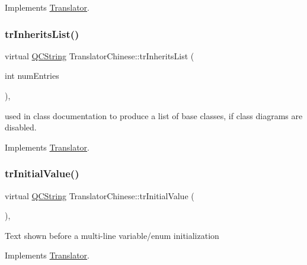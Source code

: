 Implements \mbox{\hyperlink{class_translator}{Translator}}.

\mbox{\label{class_translator_chinese_a62ac805a454546880c04bdf96c86b2ef}} 
\subsubsection{\texorpdfstring{trInheritsList()}{trInheritsList()}}
{\footnotesize\ttfamily virtual \mbox{\hyperlink{class_q_c_string}{Q\+C\+String}} Translator\+Chinese\+::tr\+Inherits\+List (\begin{DoxyParamCaption}\item[{int}]{num\+Entries }\end{DoxyParamCaption})\hspace{0.3cm}{\ttfamily [inline]}, {\ttfamily [virtual]}}

used in class documentation to produce a list of base classes, if class diagrams are disabled. 

Implements \mbox{\hyperlink{class_translator}{Translator}}.

\mbox{\label{class_translator_chinese_abc5eebbdbf49c5cbfce2fb8c99997b8a}} 
\subsubsection{\texorpdfstring{trInitialValue()}{trInitialValue()}}
{\footnotesize\ttfamily virtual \mbox{\hyperlink{class_q_c_string}{Q\+C\+String}} Translator\+Chinese\+::tr\+Initial\+Value (\begin{DoxyParamCaption}{ }\end{DoxyParamCaption})\hspace{0.3cm}{\ttfamily [inline]}, {\ttfamily [virtual]}}

Text shown before a multi-\/line variable/enum initialization 

Implements \mbox{\hyperlink{class_translator}{Translator}}.

\mbox{\label{class_translator_chinese_aa16824b1d5d30feeae80382d3ec01875}} 
